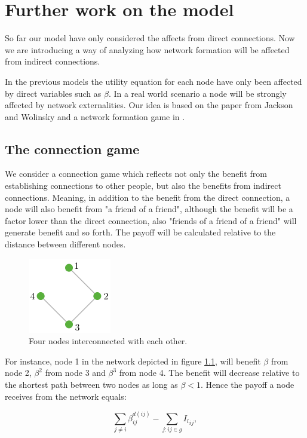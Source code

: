 \chapter{Further work on the model}
\label{secondPhaseOfModelingCyberInsurance} 

So far our model have only considered the affects from direct connections. Now we are introducing a way of analyzing how network formation will  be affected from indirect connections. 

In the previous models the utility equation for each node have only been affected by direct variables such as $\beta$. In a real world scenario a node will be strongly affected by network externalities. Our idea is based on the paper from Jackson and Wolinsky \cite{jackson1996strategic} and a network formation game in \cite{jackson2005survey}. 

\section{The connection game}
We consider a connection game which reflects not only the benefit from establishing connections to other people, but also the benefits from indirect connections. Meaning, in addition to the benefit from the direct connection, a node will also benefit from "a friend of a friend", although the benefit will be a factor lower than the direct connection, also "friends of a friend of a friend" will generate benefit and so forth. The payoff will be calculated relative to the distance between different nodes.


\begin{figure}[h]
\centering
  \includegraphics[width=0.2\linewidth]{../Figures/connectionGame.png}
  \caption{\label{fig:connectionGame} Four nodes interconnected with each other.}
\end{figure}
For instance, node 1 in the network depicted in figure \ref{fig:connectionGame}, will benefit $\beta$ from node 2, $\beta^{2}$ from node 3 and $\beta^{3}$ from node 4. The benefit will decrease relative to the shortest path between two nodes as long as $\beta < 1$. Hence the payoff a node receives from the network equals: 

\begin{equation}
\sum_{j\neq i}^{} \beta_{ij}^{d(ij)} - \sum_{j:ij\in g}^{} {I_{l}}_{ij}, 
\label{connecetionGame}
\end{equation}

